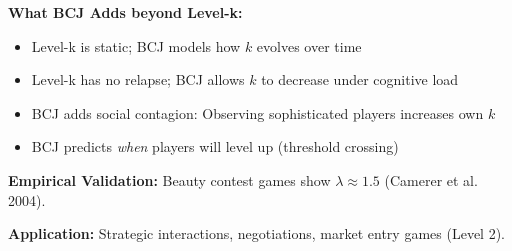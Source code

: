 \begin{tcolorbox}[colback=green!5!white, colframe=green!75!black,
    title=Theorem BCJ-T27: Level-k Thinking as Special Case]
\textbf{What BCJ Adds beyond Level-k:}
\begin{itemize}[nosep]
\item Level-k is static; BCJ models how $k$ evolves over time
\item Level-k has no relapse; BCJ allows $k$ to decrease under cognitive load
\item BCJ adds social contagion: Observing sophisticated players increases own $k$
\item BCJ predicts \textit{when} players will level up (threshold crossing)
\end{itemize}

\textbf{Empirical Validation:} Beauty contest games show $\lambda \approx 1.5$ (Camerer et al. 2004).

\textbf{Application:} Strategic interactions, negotiations, market entry games (Level 2).
\end{tcolorbox}


